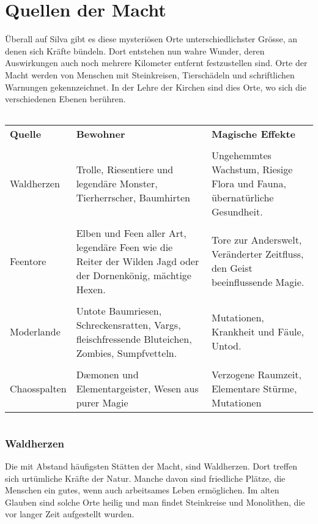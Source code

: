 \documentclass[12pt,twoside,twocolumn,openany]{book}
\begin{document}
\section{Quellen der Macht}
Überall auf Silva gibt es diese mysteriösen Orte unterschiedlichster Grösse, an denen sich Kräfte bündeln. Dort entstehen nun wahre Wunder, deren Auswirkungen auch noch mehrere Kilometer entfernt festzustellen sind. Orte der Macht werden von Menschen mit Steinkreisen, Tierschädeln und schriftlichen Warnungen gekennzeichnet. In der Lehre der Kirchen sind dies Orte, wo sich die verschiedenen Ebenen berühren.
\begin{table*}
	\begin{tabular}{l}
	\hline
	\end{tabular}
	\begin{tabularx}{\textwidth}{lXX}
		\textbf{Quelle} & \textbf{Bewohner} & \textbf{Magische Effekte}\\
		&&\\
		Waldherzen & Trolle, Riesentiere und legendäre Monster, Tierherrscher, Baumhirten &Ungehemmtes Wachstum, Riesige Flora und Fauna, übernatürliche Gesundheit.\\
		&&\\
		Feentore & Elben und Feen aller Art, legendäre Feen wie die Reiter der Wilden Jagd oder der Dornenkönig, mächtige Hexen. & Tore zur Anderswelt, Veränderter Zeitfluss, den Geist beeinflussende Magie.\\
		&&\\
		Moderlande & Untote Baumriesen, Schreckensratten, Vargs, fleischfressende Bluteichen, Zombies, Sumpfvetteln. &Mutationen, Krankheit und Fäule, Untod.\\
		&&\\
		Chaosspalten & D\ae monen und Elementargeister, Wesen aus purer Magie & Verzogene Raumzeit, Elementare Stürme, Mutationen \\
	\end{tabularx}
	\begin{tabular}{l}
	\hline
	\end{tabular}
\end{table*}

\subsubsection{Waldherzen}
Die mit Abstand häufigsten Stätten der Macht, sind Waldherzen. Dort treffen sich urtümliche Kräfte der Natur. Manche davon sind friedliche Plätze, die Menschen ein gutes, wenn auch arbeitsames Leben ermöglichen. Im alten Glauben sind solche Orte heilig und man findet Steinkreise und Monolithen, die vor langer Zeit aufgestellt wurden. 
\end{document}
